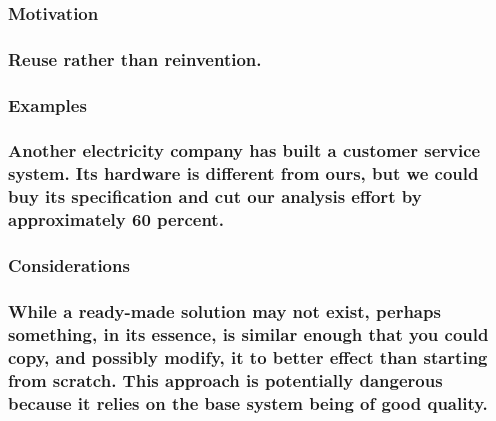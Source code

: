 \documentclass[
]{article}
\begin{document}
\hypertarget{motivation-62}{%
\subsubsection{Motivation}\label{motivation-62}}

\hypertarget{reuse-rather-than-reinvention.-1}{%
\subsubsection{Reuse rather than
reinvention.}\label{reuse-rather-than-reinvention.-1}}

\hypertarget{examples-41}{%
\subsubsection{Examples}\label{examples-41}}

\hypertarget{another-electricity-company-has-built-a-customer-service-system.-its-hardware-is-different-from-ours-but-we-could-buy-its-specification-and-cut-our-analysis-effort-by-approximately-60-percent.}{%
\subsubsection{Another electricity company has built a customer service
system. Its hardware is different from ours, but we could buy its
specification and cut our analysis effort by approximately 60
percent.}\label{another-electricity-company-has-built-a-customer-service-system.-its-hardware-is-different-from-ours-but-we-could-buy-its-specification-and-cut-our-analysis-effort-by-approximately-60-percent.}}

\hypertarget{considerations-46}{%
\subsubsection{Considerations}\label{considerations-46}}

\hypertarget{while-a-ready-made-solution-may-not-exist-perhaps-something-in-its-essence-is-similar-enough-that-you-could-copy-and-possibly-modify-it-to-better-effect-than-starting-from-scratch.-this-approach-is-potentially-dangerous-because-it-relies-on-the-base-system-being-of-good-quality.}{%
\subsubsection{While a ready-made solution may not exist, perhaps
something, in its essence, is similar enough that you could copy, and
possibly modify, it to better effect than starting from scratch. This
approach is potentially dangerous because it relies on the base system
being of good
quality.}\label{while-a-ready-made-solution-may-not-exist-perhaps-something-in-its-essence-is-similar-enough-that-you-could-copy-and-possibly-modify-it-to-better-effect-than-starting-from-scratch.-this-approach-is-potentially-dangerous-because-it-relies-on-the-base-system-being-of-good-quality.}}
\end{document}
